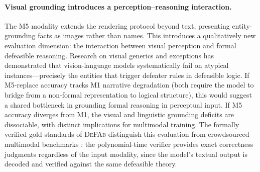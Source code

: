 \documentclass{article}
\theoremstyle{definition}
\begin{document}
\paragraph{Visual grounding introduces a perception--reasoning interaction.} The M5 modality extends the rendering protocol beyond text, presenting entity-grounding facts as images rather than names. This introduces a qualitatively new evaluation dimension: the interaction between visual perception and formal defeasible reasoning. Research on visual generics and exceptions \cite{park2025visage} has demonstrated that vision-language models systematically fail on atypical instances---precisely the entities that trigger defeater rules in defeasible logic. If M5-replace accuracy tracks M1 narrative degradation (both require the model to bridge from a non-formal representation to logical structure), this would suggest a shared bottleneck in grounding formal reasoning in perceptual input. If M5 accuracy diverges from M1, the visual and linguistic grounding deficits are dissociable, with distinct implications for multimodal training. The formally verified gold standards of \textsc{DeFAb} distinguish this evaluation from crowdsourced multimodal benchmarks \cite{chinchure2025blackswan, chang2026abductivemllm}: the polynomial-time verifier provides exact correctness judgments regardless of the input modality, since the model's textual output is decoded and verified against the same defeasible theory.
\end{document}
